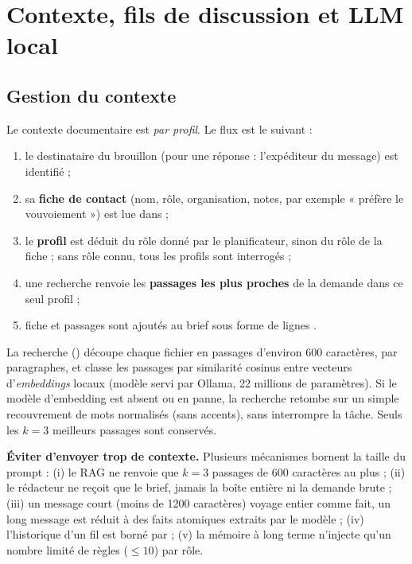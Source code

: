 \section{Contexte, fils de discussion et LLM local}

\subsection{Gestion du contexte}
\label{sec:contexte}

Le contexte documentaire est \emph{par profil}. Le flux est le suivant :

\begin{enumerate}
  \item le destinataire du brouillon (pour une réponse : l'expéditeur du message) est identifié ;
  \item sa \textbf{fiche de contact} (nom, rôle, organisation, notes, par exemple « préfère le vouvoiement ») est lue dans  ;
  \item le \textbf{profil} est déduit du rôle donné par le planificateur, sinon du rôle de la fiche ; sans rôle connu, tous les profils sont interrogés ;
  \item une recherche renvoie les \textbf{passages les plus proches} de la demande dans ce seul profil ;
  \item fiche et passages sont ajoutés au brief sous forme de lignes .
\end{enumerate}

La recherche () découpe chaque fichier en passages d'environ 600 caractères, par paragraphes, et classe les passages par similarité cosinus entre vecteurs d'\emph{embeddings} locaux (modèle  servi par Ollama, 22 millions de paramètres). Si le modèle d'embedding est absent ou en panne, la recherche retombe sur un simple recouvrement de mots normalisés (sans accents), sans interrompre la tâche. Seuls les $k=3$ meilleurs passages sont conservés.

\textbf{Éviter d'envoyer trop de contexte.} Plusieurs mécanismes bornent la taille du prompt : (i) le RAG ne renvoie que $k=3$ passages de 600 caractères au plus ; (ii) le rédacteur ne reçoit que le brief, jamais la boîte entière ni la demande brute ; (iii) un message court (moins de 1200 caractères) voyage entier comme fait, un long message est réduit à des faits atomiques extraits par le modèle ; (iv) l'historique d'un fil est borné par  ; (v) la mémoire à long terme n'injecte qu'un nombre limité de règles ($\le 10$) par rôle.

